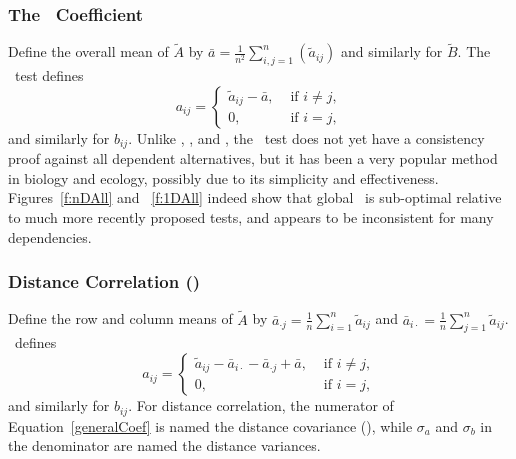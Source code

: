 \documentclass[11pt]{article}
\begin{document}
\subsubsection{The \Mantel~Coefficient}
\label{appen:mantel}

Define the overall mean of $\tilde{A}$ by $\bar{a}=\tfrac{1}{n^2}\sum_{i,j=1}^{n}(\tilde{a}_{ij})$ and similarly for $\tilde{B}$. 
The \Mantel~test defines 
\[a_{ij} = \left\{
  \begin{array}{lr}
    \tilde{a}_{ij}-\bar{a}, & \mbox{ if } i \neq j, \\
    0, &\mbox{ if } i = j,
  \end{array}
\right.
\]
and similarly for $b_{ij}$. 
Unlike \Dcorr, \Mcorr, and \Hhg, the \Mantel~test does not yet have a consistency proof against all dependent alternatives, 
but it has been a very popular method in biology and ecology, possibly due to its simplicity and effectiveness. Figures~\ref{f:nDAll} and ~\ref{f:1DAll} indeed show that global \Mantel~is sub-optimal relative to much more recently proposed tests, and appears to be inconsistent for many dependencies. 

\subsubsection{Distance Correlation (\Dcorr)}
\label{appen:dcorr}

Define the row and column means of $\tilde{A}$ by $\bar{a}_{\cdot j}=\frac{1}{n} \sum_{i=1}^n \tilde{a}_{ij}$ and $\bar{a}_{i \cdot}=\frac{1}{n} \sum_{j=1}^n \tilde{a}_{ij} $.  
\Dcorr~defines 
\[a_{ij} = \left\{
  \begin{array}{lr}
    \tilde{a}_{ij}-\bar{a}_{i\cdot} - \bar{a}_{\cdot j} + \bar{a}, & \mbox{ if } i \neq j, \\
    0, &\mbox{ if } i = j,
  \end{array}
\right.
\]
and similarly for $b_{ij}$. 
For distance correlation, the numerator of Equation~\ref{generalCoef} is named the distance covariance (\Dcov), while $\sigma_a$ and $\sigma_b$ in the denominator are named the distance variances. 
\end{document}

